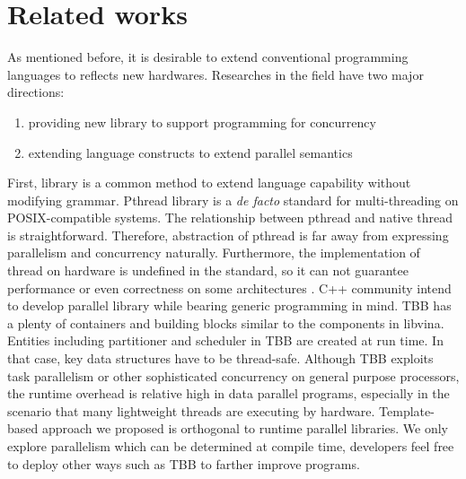 \section{Related works}\label{sec:related}
As mentioned before, it is desirable to extend conventional programming languages to reflects new hardwares. Researches in the field have two major directions:
\begin{enumerate}
\item providing new library to support programming for concurrency
\item extending language constructs to extend parallel semantics
\end{enumerate}

First, library is a common method to extend language capability
without modifying grammar. Pthread library is a \textit{de facto} standard for
multi-threading on POSIX-compatible systems. The relationship between
pthread and native thread is straightforward. Therefore, abstraction
of pthread is far away from expressing parallelism and concurrency
naturally. Furthermore, the implementation of thread on hardware is
undefined in the standard, so it can not guarantee performance or even
correctness on some architectures \cite{Boehm05}. C++ community intend to develop parallel library while bearing
generic programming in mind. TBB  has a plenty of
containers and building blocks similar to the components in libvina. Entities including partitioner and
scheduler in TBB are created at run time. In that case, key data
structures have to be thread-safe. Although TBB exploits task
parallelism or other sophisticated concurrency on general purpose
processors, the runtime overhead is relative high in data parallel
programs, especially in the scenario that many lightweight threads are
executing by hardware. Template-based approach we proposed is orthogonal to runtime parallel
libraries. We only explore parallelism which can be determined at
compile time, developers feel free to deploy other ways such as TBB to
farther improve programs.
 


